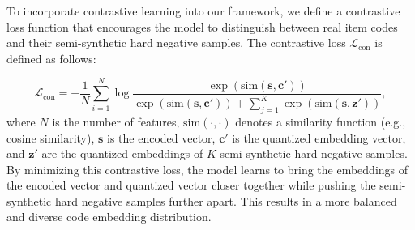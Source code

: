         To incorporate contrastive learning into our framework, we define a contrastive loss function that encourages the model to distinguish between real item codes and their semi-synthetic hard negative samples. The contrastive loss $\mathcal{L}_{\text{con}}$ is defined as follows:
    
        \begin{equation}
        \mathcal{L}_{\text{con}} = -\frac{1}{N} \sum_{i=1}^{N} \log \frac{\exp(\text{sim}(\mathbf{s}, \mathbf{c}'))}{\exp(\text{sim}(\mathbf{s}, \mathbf{c}')) + \sum_{j=1}^{K} \exp(\text{sim}(\mathbf{s}, \mathbf{z}'))},
        \label{eq:loss_con}
        \end{equation}
        where $N$ is the number of features, $\text{sim}(\cdot, \cdot)$ denotes a similarity function (e.g., cosine similarity), 
        $\mathbf{s}$ is the encoded vector,
        $\mathbf{c}'$ is the quantized embedding vector, and $\mathbf{z}'$ are the quantized embeddings of $K$ semi-synthetic hard negative samples.
        By minimizing this contrastive loss, the model learns to bring the embeddings of the encoded vector and quantized vector closer together while pushing the semi-synthetic hard negative samples further apart. This results in a more balanced and diverse code embedding distribution.
